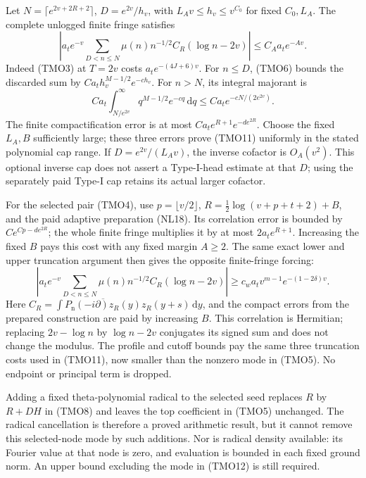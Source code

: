 \documentclass[11pt]{article}
\theoremstyle{remark}\newtheorem{remark}[theorem]{Remark}
\newcommand{\dd}{\,\mathrm d}
\begin{document}
Let \(N=\lceil e^{2v+2R+2}\rceil\),
\(D=e^{2v}/h_v\), with
\(L_Av\le h_v\le v^{C_0}\) for fixed \(C_0,L_A\).
The complete unlogged finite fringe satisfies
\[
 \left|a_te^{-v}\sum_{D<n\le N}
          \mu(n)n^{-1/2}C_R(\log n-2v)\right|
                                \le C_Aa_te^{-Av}.            \tag{TMO11}
\]
Indeed (TMO3) at \(T=2v\) costs \(a_te^{-(4J+6)v}\).
For \(n\le D\), (TMO6) bounds the discarded sum by
\(Ca_th_v^{M-1/2}e^{-ch_v}\).
For \(n>N\), its integral majorant is
\[
 Ca_t\int_{N/e^{2v}}^\infty q^{M-1/2}e^{-cq}\dd q
                           \le Ca_te^{-cN/(2e^{2v})}.
\]
The finite compactification error is at most
\(Ca_te^{R+1}e^{-d e^{2R}}\).
Choose the fixed \(L_A,B\) sufficiently large; these three
errors prove (TMO11) uniformly in the stated polynomial cap range.
If \(D=e^{2v}/(L_Av)\), the inverse cofactor is \(O_A(v^2)\).
This optional inverse cap does not assert a Type-I-head estimate
at that \(D\); using the separately paid Type-I cap retains
its actual larger cofactor.

For the selected pair (TMO4), use \(p=\lfloor v/2\rfloor\),
\(R=\frac12\log(v+p+t+2)+B\), and the paid adaptive
preparation (NL18). Its correlation error is bounded by
\(Ce^{Cp-d e^{2R}}\); the whole finite fringe multiplies it
by at most \(2a_te^{R+1}\). Increasing the fixed \(B\)
pays this cost with any fixed margin \(A\ge2\).
The same exact lower and upper truncation argument then
gives the opposite finite-fringe forcing:
\[
 \left|a_te^{-v}\sum_{D<n\le N}
       \mu(n)n^{-1/2}C_R(\log n-2v)\right|
                    \ge c_wa_tv^{m-1}e^{-(1-2\delta)v}.        \tag{TMO12}
\]
Here \(C_R=\int\overline{P_{\mathrm n}(-i\partial)z_R(y)}
 z_R(y+s)\dd y\), and the compact errors from the prepared
construction are paid by increasing \(B\).
This correlation is Hermitian; replacing \(2v-\log n\)
by \(\log n-2v\) conjugates its signed sum and does not change
the modulus. The profile and cutoff bounds pay the same
three truncation costs used in (TMO11), now smaller than the
nonzero mode in (TMO5). No endpoint or principal term is dropped.

Adding a fixed theta-polynomial radical to the selected seed
replaces \(R\) by \(R+DH\) in (TMO8) and leaves the top
coefficient in (TMO5) unchanged.
The radical cancellation is therefore a proved arithmetic result,
but it cannot remove this selected-node mode by such additions.
Nor is radical density available: its Fourier value at that node
is zero, and evaluation is bounded in each fixed ground norm.
An upper bound excluding the mode in (TMO12) is still required.
\end{document}
